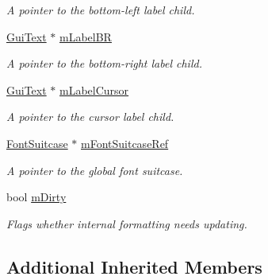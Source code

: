 \begin{DoxyCompactItemize}
\begin{DoxyCompactList}\small\item\em A pointer to the bottom-\/left label child. \end{DoxyCompactList}\item 
\hypertarget{class_gui_plot_a121aa05831f1bc2b9ff01f788d375ff4}{\hyperlink{class_gui_text}{Gui\-Text} $\ast$ \hyperlink{class_gui_plot_a121aa05831f1bc2b9ff01f788d375ff4}{m\-Label\-B\-R}}\label{class_gui_plot_a121aa05831f1bc2b9ff01f788d375ff4}

\begin{DoxyCompactList}\small\item\em A pointer to the bottom-\/right label child. \end{DoxyCompactList}\item 
\hypertarget{class_gui_plot_afc8f4aaacc422a1dafb68a502bd4a390}{\hyperlink{class_gui_text}{Gui\-Text} $\ast$ \hyperlink{class_gui_plot_afc8f4aaacc422a1dafb68a502bd4a390}{m\-Label\-Cursor}}\label{class_gui_plot_afc8f4aaacc422a1dafb68a502bd4a390}

\begin{DoxyCompactList}\small\item\em A pointer to the cursor label child. \end{DoxyCompactList}\item 
\hypertarget{class_gui_plot_ae25d8a1862e059b1a0f63275c924a83c}{\hyperlink{class_font_suitcase}{Font\-Suitcase} $\ast$ \hyperlink{class_gui_plot_ae25d8a1862e059b1a0f63275c924a83c}{m\-Font\-Suitcase\-Ref}}\label{class_gui_plot_ae25d8a1862e059b1a0f63275c924a83c}

\begin{DoxyCompactList}\small\item\em A pointer to the global font suitcase. \end{DoxyCompactList}\item 
\hypertarget{class_gui_plot_ad69836607ae29886bad122771c35e36c}{bool \hyperlink{class_gui_plot_ad69836607ae29886bad122771c35e36c}{m\-Dirty}}\label{class_gui_plot_ad69836607ae29886bad122771c35e36c}

\begin{DoxyCompactList}\small\item\em Flags whether internal formatting needs updating. \end{DoxyCompactList}\end{DoxyCompactItemize}
\subsection*{Additional Inherited Members}


